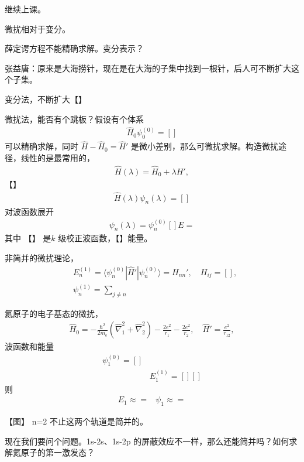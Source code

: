 继续上课。

微扰相对于变分。

薛定谔方程不能精确求解。变分表示？

张益唐：原来是大海捞针，现在是在大海的子集中找到一根针，后人可不断扩大这个子集。

变分法，不断扩大【】

微扰法，能否有个跳板？假设有个体系
\begin{align}
    \hat H_0 \psi_0^{(0)} = []
\end{align}
可以精确求解，同时 $\hat H - \hat H_0 = \hat H'$ 是微小差别，那么可微扰求解。构造微扰途径，线性的是最常用的，
\begin{align}
    \hat H(\lambda) = \hat H_0 + \lambda H',
\end{align}
【】
\begin{align}
    \hat H(\lambda) \psi_n(\lambda) = []
\end{align}
对波函数展开
\begin{align}
    \psi_n(\lambda) = \psi_n^{(0)} []
    E = 
\end{align}
其中 【】 是$k$ 级校正波函数，【】能量。

非简并的微扰理论，
\begin{align}
    &E_n^{(1)} = \langle \psi_n^{(0)} | \hat H' | \psi_n^{(0)} \rangle = H_{nn}', \quad H_{ij} = [], \\
    &\psi_n^{(1)} = \sum_{j\neq n}
\end{align}


氦原子的电子基态的微扰，
\begin{align}
    \hat H_0 = - \frac{\hbar^2}{2m_{\mathrm e}} (\hat \nabla_1^2 + \hat \nabla_2^2) - \frac{2e^2}{r_1} - \frac{2e^2}{r_2}, \quad \hat H' = \frac{e^2}{r_{12}},
\end{align}
波函数和能量
\begin{align}
    \psi_1^{(0)} = []\\
    &E_1^{(1)} = [][] %
\end{align}
则
\begin{align}
    E_1 \approx = 
    &\psi_1 \approx = 
\end{align}

【图】
n=2 不止这两个轨道是简并的。

现在我们要问个问题。1s-2s、1s-2p 的屏蔽效应不一样，那么还能简并吗？如何求解氦原子的第一激发态？

